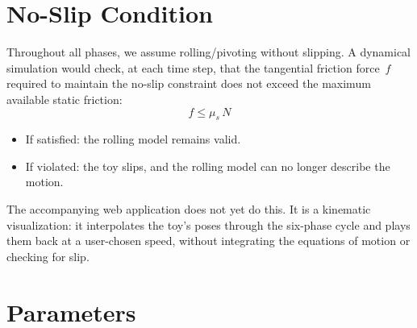 \documentclass[11pt,a4paper]{article}
\theoremstyle{plain}
\theoremstyle{definition}
\theoremstyle{remark}
\begin{document}
\section{No-Slip Condition}
\label{sec:noslip}

Throughout all phases, we assume rolling/pivoting without slipping.  A dynamical simulation would check, at each time step, that the tangential friction force~$f$ required to maintain the no-slip constraint does not exceed the maximum available static friction:
\begin{equation}
    f \leq \mu_s\, N
    \label{eq:noslip}
\end{equation}

\begin{itemize}
    \item If satisfied: the rolling model remains valid.
    \item If violated: the toy slips, and the rolling model can no longer describe the motion.
\end{itemize}

The accompanying web application does not yet do this.  It is a kinematic visualization: it interpolates the toy's poses through the six-phase cycle and plays them back at a user-chosen speed, without integrating the equations of motion or checking for slip.


\section{Parameters}
\label{sec:params}
\end{document}
